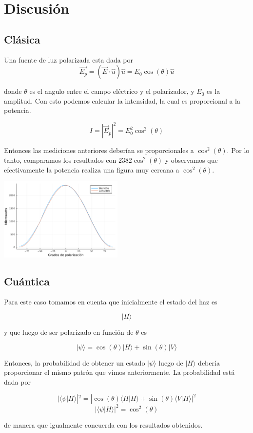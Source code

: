 \documentclass[twocolumn]{article}
\begin{document}
	\section{Discusión}
	\subsection{Clásica}

		Una fuente de luz polarizada esta dada por
		$$
		\vec{E_p}=(\vec{E}\cdot\hat{u})\hat{u}=E_0\cos(\theta)\hat{u}
		$$

		donde $\theta$ es el angulo entre el campo eléctrico y el polarizador, y $E_0$ es la amplitud. Con esto podemos calcular la intensidad, la cual es proporcional a la potencia.

		$$
		I=|\vec E_p|^2=E_0^2\cos^2(\theta)
		$$

		Entonces las mediciones anteriores deberían se proporcionales a $\cos^2(\theta)$. Por lo tanto, comparamos los resultados con $2382\cos^2(\theta)$ y observamos que efectivamente la potencia realiza una figura muy cercana a $\cos^2(\theta)$.

		\begin{center}
			\includegraphics[width=175pt]{img/plot_compare.pdf}
		\end{center}
	
	\subsection{Cuántica}

		Para este caso tomamos en cuenta que inicialmente el estado del haz es

		$$
		|H\rangle
		$$

		y que luego de ser polarizado en función de $\theta$ es

		$$
		|\psi\rangle=\cos(\theta)|H\rangle+\sin(\theta)|V\rangle
		$$

		Entonces, la probabilidad de obtener un estado $|\psi\rangle$ luego de $|H\rangle$ debería proporcionar el mismo patrón que vimos anteriormente. La probabilidad está dada por

		$$
			|\langle\psi|H\rangle|^2=|\cos(\theta)\langle{H}|H\rangle + \sin(\theta)\langle{V}|H\rangle|^2
		$$
		$$
			|\langle\psi|H\rangle|^2=\cos^2(\theta)
		$$

		de manera que igualmente concuerda con los resultados obtenidos.
\end{document}

